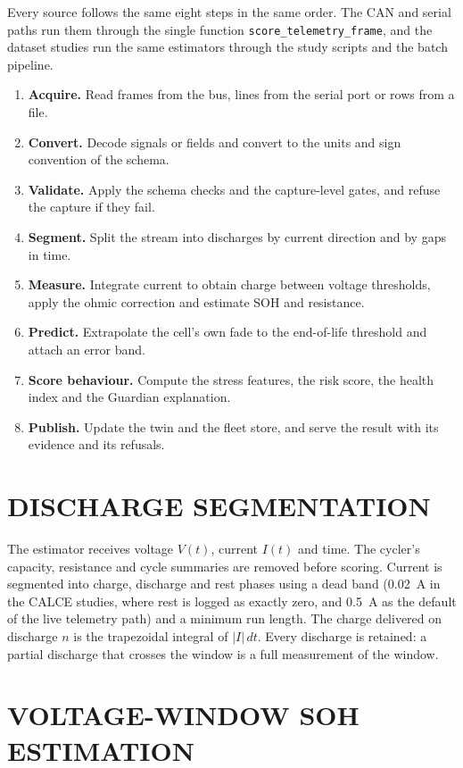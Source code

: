 Every source follows the same eight steps in the same order. The CAN and serial paths run them through the single function \texttt{score\_telemetry\_frame}, and the dataset studies run the same estimators through the study scripts and the batch pipeline.
\begin{enumerate}
	\item \textbf{Acquire.} Read frames from the bus, lines from the serial port or rows from a file.
	\item \textbf{Convert.} Decode signals or fields and convert to the units and sign convention of the schema.
	\item \textbf{Validate.} Apply the schema checks and the capture-level gates, and refuse the capture if they fail.
	\item \textbf{Segment.} Split the stream into discharges by current direction and by gaps in time.
	\item \textbf{Measure.} Integrate current to obtain charge between voltage thresholds, apply the ohmic correction and estimate SOH and resistance.
	\item \textbf{Predict.} Extrapolate the cell's own fade to the end-of-life threshold and attach an error band.
	\item \textbf{Score behaviour.} Compute the stress features, the risk score, the health index and the Guardian explanation.
	\item \textbf{Publish.} Update the twin and the fleet store, and serve the result with its evidence and its refusals.
\end{enumerate}

\section{DISCHARGE SEGMENTATION}
\label{sec:segment}

The estimator receives voltage $V(t)$, current $I(t)$ and time. The cycler's capacity, resistance and cycle summaries are removed before scoring. Current is segmented into charge, discharge and rest phases using a dead band (0.02~A in the CALCE studies, where rest is logged as exactly zero, and 0.5~A as the default of the live telemetry path) and a minimum run length. The charge delivered on discharge $n$ is the trapezoidal integral of $|I|\,dt$. Every discharge is retained: a partial discharge that crosses the window is a full measurement of the window.

\section{VOLTAGE-WINDOW SOH ESTIMATION}
\label{sec:soh-method}

